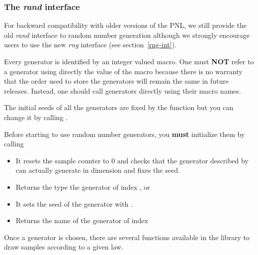 

\subsubsection{The {\em rand} interface}
\label{rand-int}

For backward compatibility with older versions of the PNL, we still provide the old
{\em rand} interface to random number generation although we strongly encourage users
to use the new {\em rng} interface (see section~\ref{rng-int}).

Every generator is identified by an integer valued macro. One must {\bf NOT} refer
to a generator using directly the value of the macro  because there
is no warranty that the order used to store the generators will remain the same in
future releases.  Instead, one should call generators directly using their macro
names.

The initial seeds of all the generators are fixed by the function
 but you can change it by calling .

Before starting to use random number generators, you {\bf must} initialize them by
calling
\begin{itemize}
\item {}
  \sshortdescribe It resets the sample counter to $0$ and checks that the
  generator described by  can actually generate
   in dimension  and fixes the seed.
\end{itemize}

\begin{itemize}

\item {}
  \sshortdescribe Returns the type the generator of index ,
   or 
\item {}
  \sshortdescribe It sets the seed of the generator  with
  .
\item {}
  \sshortdescribe Returns the name of the generator of index 
\end{itemize}

Once a generator is chosen, there are several functions available in the
library to draw samples according to a given law.

